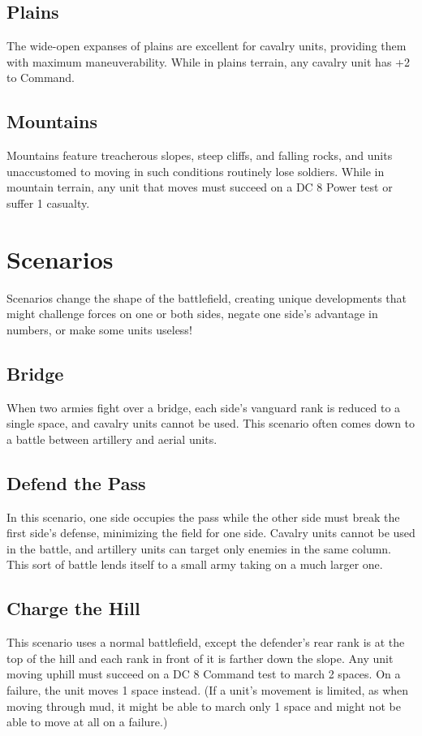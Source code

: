 \documentclass[10pt,a4paper,twoside,bg=print,twocolumn,openany,nodeprecatedcode]{dndbook}
\begin{document}
\subsection{Plains}
The wide-open expanses of plains are excellent for cavalry units, providing them with maximum maneuverability. While in plains terrain, any cavalry unit has +2 to Command.

\subsection{Mountains}
Mountains feature treacherous slopes, steep cliffs, and falling rocks, and units unaccustomed to moving in such conditions routinely lose soldiers. While in mountain terrain, any unit that moves must succeed on a DC 8 Power test or suffer 1 casualty.

\section{Scenarios}
Scenarios change the shape of the battlefield, creating unique developments that might challenge forces on one or both sides, negate one side's advantage in numbers, or make some units useless!

\subsection{Bridge}
When two armies fight over a bridge, each side's vanguard rank is reduced to a single space, and cavalry units cannot be used. This scenario often comes down to a battle between artillery and aerial units.

\subsection{Defend the Pass}
In this scenario, one side occupies the pass while the other side must break the first side's defense, minimizing the field for one side. Cavalry units cannot be used in the battle, and artillery units can target only enemies in the same column. This sort of battle lends itself to a small army taking on a much larger one.

\subsection{Charge the Hill}
This scenario uses a normal battlefield, except the defender's rear rank is at the top of the hill and each rank in front of it is farther down the slope. Any unit moving uphill must succeed on a DC 8 Command test to march 2 spaces. On a failure, the unit moves 1 space instead. (If a unit's movement is limited, as when moving through mud, it might be able to march only 1 space and might not be able to move at all on a failure.)
\end{document}
